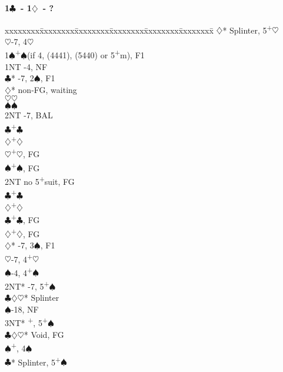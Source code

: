 \documentclass[10pt]{article}
\renewcommand{\c}{$\clubsuit$}
\renewcommand{\d}{$\diamondsuit$}
\newcommand{\h}{$\heartsuit$}
\newcommand{\s}{$\spadesuit$}
\newcommand{\p}{\textsuperscript{+}}
\newcommand{\m}{\textsuperscript{\textminus}}
\newenvironment{bidtable}[1][]
{\textbf{#1}
  \begin{adjustwidth}{1em}{}
    \addvspace{2pt}
    \begin{tabbing}
      xxxxxxxx\=xxxxxxxx\=xxxxxxxx\=xxxxxxxx\=xxxxxxxx\=xxxxxxxx\=\kill}
{\end{tabbing}\end{adjustwidth}\bigskip}%
\begin{document}
\begin{multicols*}{2}
\begin{bidtable}[1\c\ - 1\d\ - ?]
     \d* \> Splinter, 5\p\h                    \\
     \h  {}-7, 4\h                           \\
1\s  {}\p\s (if 4, (4441), (5440) or 5\p m), F1  \\
     \> 1NT  -4, NF                            \\
     \c* {}-7, 2\m\s, F1                     \\
     \>      \d*     \> non-FG, waiting        \\
     \>      \>          \h {}\h             \\
     \>      \>          \s {}\s             \\
     \>      \>          \> 2NT -7, BAL        \\
     \>      \>          \c {}\p\c           \\
     \>      \>          \d {}\p\d           \\
     \>      \h      {}\p\h, FG              \\
     \>      \s      {}\p\s, FG              \\
     \>      \> 2NT      \> no 5\p suit, FG        \\
     \>      \>          \c {}\p\c           \\
     \>      \>          \d {}\p\d           \\
     \>      \c      {}\p\c, FG              \\%
     \>      \d      {}\p\d, FG              \\
     \d* {}-7, 3\s, F1                       \\
     \h  {}-7, 4\p\h                         \\
     \s  {}-4, 4\p\s                         \\
     \> 2NT* -7, 5\p\s                         \\
     \>      \c\d\h* \> Splinter               \\
     \>      \s      {}-18, NF              \\
     \>      \> 3NT*     \p, 5\p\s            \\
     \>      \c\d\h* \> Void, FG               \\
     \>      \s      {}\p, 4\s              \\
     \c* \> Splinter, 5\p\s                    \\

\end{bidtable}
\end{multicols*}
\end{document}

